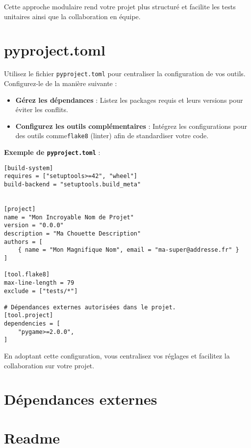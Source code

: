 \documentclass[a4paper,12pt]{article}
\begin{document}
Cette approche modulaire rend votre projet plus structuré et facilite les tests unitaires ainsi que la collaboration en équipe.
\section{pyproject.toml}

Utilisez le fichier \texttt{pyproject.toml} pour centraliser la configuration de vos outils. Configurez-le de la manière suivante :

\begin{itemize}
    \item \textbf{Gérez les dépendances} : Listez les packages requis et leurs versions pour éviter les conflits.
    \item \textbf{Configurez les outils complémentaires} : Intégrez les configurations pour des outils comme\texttt{flake8} (linter) afin de standardiser votre code.
\end{itemize}

\textbf{Exemple de \texttt{pyproject.toml}} :

\begin{lstlisting}
[build-system]
requires = ["setuptools>=42", "wheel"]
build-backend = "setuptools.build_meta"


[project]
name = "Mon Incroyable Nom de Projet"
version = "0.0.0"
description = "Ma Chouette Description"
authors = [
    { name = "Mon Magnifique Nom", email = "ma-super@addresse.fr" }
]

[tool.flake8]
max-line-length = 79
exclude = ["tests/*"]

# Dépendances externes autorisées dans le projet.
[tool.project]
dependencies = [
    "pygame>=2.0.0",
]
\end{lstlisting}

En adoptant cette configuration, vous centralisez vos réglages et facilitez la collaboration sur votre projet.


\section{Dépendances externes}


\section{Readme}
\end{document}
